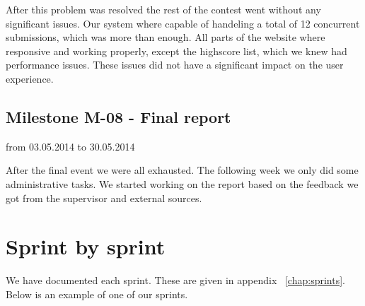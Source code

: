 After this problem was resolved the rest of the contest went without any
significant issues. Our system where capable of handeling a total of 12
concurrent submissions, which was more than enough. All parts of the website where
responsive and working properly, except the highscore list, which we
knew had performance issues. These issues did not have a significant
impact on the user experience.

\pagebreak
\subsection{Milestone M-08 - Final report}
\label{sec:M08}
from 03.05.2014 to 30.05.2014

After the final event we were all exhausted. The following week we only
did some administrative tasks. We started working on the report based on 
the feedback we got from the supervisor and external sources. 

\section{Sprint by sprint}
We have documented each sprint. These are given in appendix
~\ref{chap:sprints}. Below is an example of one of our sprints.

